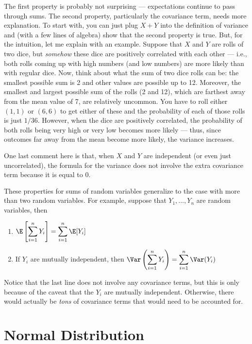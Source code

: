 \documentclass[
  letterpaper,
  DIV=11,
  numbers=noendperiod]{scrreprt}
\begin{document}
The first property is probably not surprising --- expectations continue
to pass through sums. The second property, particularly the covariance
term, needs more explanation. To start with, you can just plug \(X+Y\)
into the definition of variance and (with a few lines of algebra) show
that the second property is true. But, for the intuition, let me explain
with an example. Suppose that \(X\) and \(Y\) are rolls of two dice, but
\emph{somehow} these dice are positively correlated with each other ---
i.e., both rolls coming up with high numbers (and low numbers) are more
likely than with regular dice. Now, think about what the sum of two dice
rolls can be: the smallest possible sum is 2 and other values are
possible up to 12. Moreover, the smallest and largest possible sum of
the rolls (2 and 12), which are farthest away from the mean value of 7,
are relatively uncommon. You have to roll either \((1,1)\) or \((6,6)\)
to get either of these and the probability of each of those rolls is
just \(1/36\). However, when the dice are positively correlated, the
probability of both rolls being very high or very low becomes more
likely --- thus, since outcomes far away from the mean become more
likely, the variance increases.

One last comment here is that, when \(X\) and \(Y\) are independent (or
even just uncorrelated), the formula for the variance does not involve
the extra covariance term because it is equal to 0.

These properties for sums of random variables generalize to the case
with more than two random variables. For example, suppose that
\(Y_1, \ldots, Y_n\) are random variables, then

\begin{enumerate}
\def\labelenumi{\arabic{enumi}.}
\item
  \(\E\left[ \displaystyle \sum_{i=1}^n Y_i \right] = \displaystyle \sum_{i=1}^n \E[Y_i]\)
\item
  If \(Y_i\) are mutually independent, then
  \(\Var\left( \displaystyle \sum_{i=1}^n Y_i \right) = \displaystyle \sum_{i=1}^n \Var(Y_i)\)
\end{enumerate}

Notice that the last line does not involve any covariance terms, but
this is only because of the caveat that the \(Y_i\) are mutually
independent. Otherwise, there would actually be \emph{tons} of
covariance terms that would need to be accounted for.

\section{Normal Distribution}\label{normal-distribution}
\end{document}
